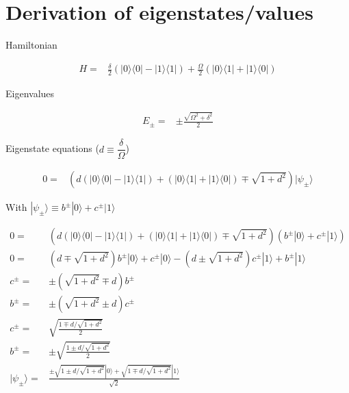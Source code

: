 \documentclass[10pt,fleqn]{article}
\newcommand{\eqar}[1]
{
  \begin{align*}
    #1
  \end{align*}
}
\newcommand{\paren}[1]{{\left({#1}\right)}}
\begin{document}
\section{Derivation of eigenstates/values}
Hamiltonian
\eqar{
  H=&\frac{\delta}{2}\paren{|0\rangle\langle0|-|1\rangle\langle1|}+\frac{\Omega}{2}\paren{|0\rangle\langle1|+|1\rangle\langle0|}
}
Eigenvalues
\eqar{
  E_\pm=&\pm\frac{\sqrt{\Omega^2+\delta^2}}{2}
}
Eigenstate equations ($d\equiv\dfrac{\delta}{\Omega}$)
\eqar{
  0=&\paren{d\paren{|0\rangle\langle0|-|1\rangle\langle1|}+\paren{|0\rangle\langle1|+|1\rangle\langle0|}\mp\sqrt{1+d^2}}|\psi_\pm\rangle
}
With $|\psi_\pm\rangle\equiv b^\pm|0\rangle+c^\pm|1\rangle$
\eqar{
  0=&\paren{d\paren{|0\rangle\langle0|-|1\rangle\langle1|}+\paren{|0\rangle\langle1|+|1\rangle\langle0|}\mp\sqrt{1+d^2}}\paren{b^\pm|0\rangle+c^\pm|1\rangle}\\
  0=&\paren{d\mp\sqrt{1+d^2}}b^\pm|0\rangle+c^\pm|0\rangle-\paren{d\pm\sqrt{1+d^2}}c^\pm|1\rangle+b^\pm|1\rangle\\
  c^\pm=&\pm\paren{\sqrt{1+d^2}\mp d}b^\pm\\
  b^\pm=&\pm\paren{\sqrt{1+d^2}\pm d}c^\pm\\
  c^\pm=&\sqrt{\frac{1\mp d/\sqrt{1+d^2}}{2}}\\
  b^\pm=&\pm\sqrt{\frac{1\pm d/\sqrt{1+d^2}}{2}}\\
  |\psi_\pm\rangle=&\frac{\pm\sqrt{1\pm d/\sqrt{1+d^2}}|0\rangle+\sqrt{1\mp d/\sqrt{1+d^2}}|1\rangle}{\sqrt2}
}
\end{document}
